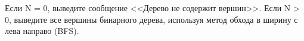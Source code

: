 Если N = 0, выведите сообщение <<Дерево не содержит вершин>>.
Если N > 0, выведите все вершины бинарного дерева, используя метод обхода в ширину с лева направо (BFS).
